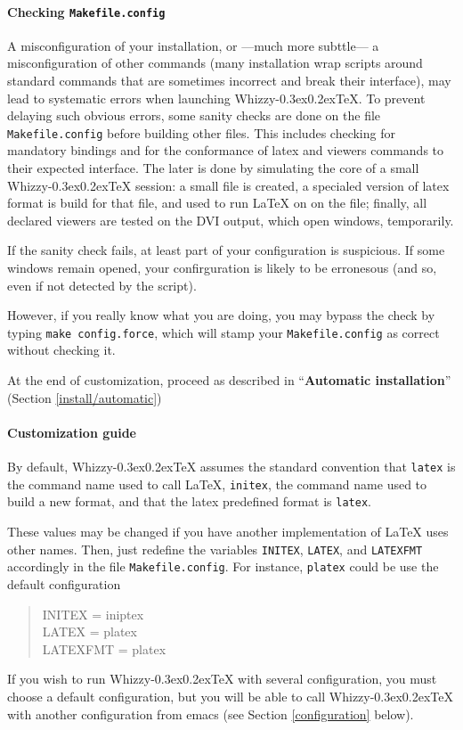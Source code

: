 \documentclass[12pt]{article}
\makeatletter
\let \lst \verb
\def \whizzy {{Whizzy\kern -0.3ex\raise 0.2ex\hbox{\let \@\relax\TeX}}}
\makeatother
\begin{document}
\paragraph {Checking {\tt Makefile.config}}

A misconfiguration of your installation, or ---much more subttle--- a
misconfiguration of other commands (many installation wrap scripts around
standard commands that are sometimes incorrect and break their interface),
may lead to systematic errors when launching {\whizzy}. To prevent delaying
such obvious errors, some sanity checks are done on the file
\lst"Makefile.config" before building other files.
This includes checking for mandatory bindings and for the conformance of
latex and viewers commands to their expected interface.
The later is done by simulating the core of a small {\whizzy} session:
a small file is created, a specialed version of latex format is build for 
that file, and used to run {\LaTeX} on on the file; finally, all 
declared viewers are tested on the DVI output, which open
windows, temporarily. 

If the sanity check fails, at least part of your configuration is 
suspicious. If some windows remain opened, your confirguration is likely to
be erronesous (and so, even if not detected by the script).  

However, if you really know what you are doing, you may bypass the check by
typing \lst"make config.force", which will stamp your \lst"Makefile.config"
as correct without checking it.

At the end of customization, proceed as described in ``{\bf Automatic
installation}'' (Section \ref {install/automatic})

\paragraph {Customization guide}

By default, {\whizzy} assumes the standard convention that 
\lst"latex" is the command name used to call {\LaTeX}, 
\lst"initex", the command name used to build a new format, and that the latex 
predefined format is \lst"latex".

These values may be changed if you have another implementation of {\LaTeX}
uses other names. Then, just redefine the variables \lst"INITEX",
\lst"LATEX", and \lst"LATEXFMT" accordingly in the file
\lst"Makefile.config".
%
For instance, \lst"platex" could be use the default configuration
\begin{quote}
\begin{tt}
INITEX = iniptex\\
LATEX = platex\\
LATEXFMT = platex
\end{tt}
\end{quote}
If you wish to run {\whizzy} with several configuration, you must choose a
default configuration, but you will be able to call {\whizzy} with another
configuration from emacs (see Section \ref{configuration} below). 
\end{document}
